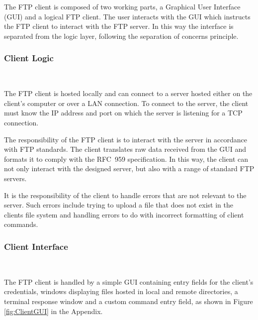 \documentclass[10pt,twocolumn]{witseiepaper}
\begin{document}
The FTP client is composed of two working parts, a Graphical User Interface (GUI) and a logical FTP client. The user interacts with the GUI which instructs the FTP client to interact with the FTP server. In this way the interface is separated from the logic layer, following the separation of concerns principle.

\vspace*{-2mm}
\subsubsection{Client Logic} $     $

The FTP client is hosted locally and can connect to a server hosted either on the client's computer or over a LAN connection. To connect to the server, the client must know the IP address and port on which the server is listening for a TCP connection.

The responsibility of the FTP client is to interact with the server in accordance with FTP standards. The client translates raw data received from the GUI and formats it to comply with the RFC~959 specification. In this way, the client can not only interact with the designed server, but also  with a range of standard FTP servers.

It is the responsibility of the client to handle errors that are not relevant to the server. Such errors include trying to upload a file that does not exist in the clients file system and handling errors to do with incorrect formatting of client commands.

\vspace*{-2mm}
\subsubsection{Client Interface} $      $\label{GUI}

The FTP client is handled by a simple GUI containing entry fields for the client's credentials, windows displaying files hosted in local and remote directories, %
a terminal response window and a custom command entry field, as shown in Figure \ref{fig:ClientGUI} in the Appendix.

\end{document}
